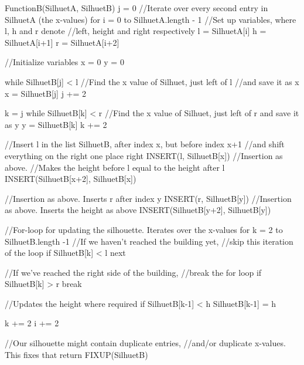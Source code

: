 \documentclass[a4paper,oneside,article,11pt]{memoir}
\begin{document}
\begin{VerbatimTest}
FunctionB(SilhuetA, SilhuetB)
    j = 0
    //Iterate over every second entry in SilhuetA (the x-values)
    for i = 0 to SilhuetA.length - 1
        //Set up variables, where l, h and r denote
        //left, height and right respectively
        l = SilhuetA[i]
        h = SilhuetA[i+1]
        r = SilhuetA[i+2]

        //Initialize variables
        x = 0
        y = 0

        while SilhuetB[j] < l
            //Find the x value of Silhuet, just left of l
            //and save it as x
            x = SilhuetB[j]
            j += 2
        
        k = j
        while SilhuetB[k] < r 
            //Find the x value of Silhuet, just left of r and save it as y
            y = SilhuetB[k]
            k += 2

        //Insert l in the list SilhuetB, after index x, but before index x+1
        //and shift everything on the right one place right
        INSERT(l, SilhuetB[x])
        //Insertion as above.
        //Makes the height before l equal to the height after l
        INSERT(SilhuetB[x+2], SilhuetB[x])

        //Insertion as above. Inserts r after index y
        INSERT(r, SilhuetB[y])
        //Insertion as above. Inserts the height as above
        INSERT(SilhuetB[y+2], SilhuetB[y])

        //For-loop for updating the silhouette. Iterates over the x-values
        for k = 2 to SilhuetB.length -1
            //If we haven't reached the building yet,
            //skip this iteration of the loop
            if SilhuetB[k] < l
                next

            //If we've reached the right side of the building,
            //break the for loop
            if SilhuetB[k] > r
                break

            //Updates the height where required
            if SilhuetB[k-1] < h
                SilhuetB[k-1] = h

            k += 2
        i += 2

    //Our silhouette might contain duplicate entries,
    //and/or duplicate x-values. This fixes that
    return FIXUP(SilhuetB)

\end{VerbatimTest}


\end{document}
